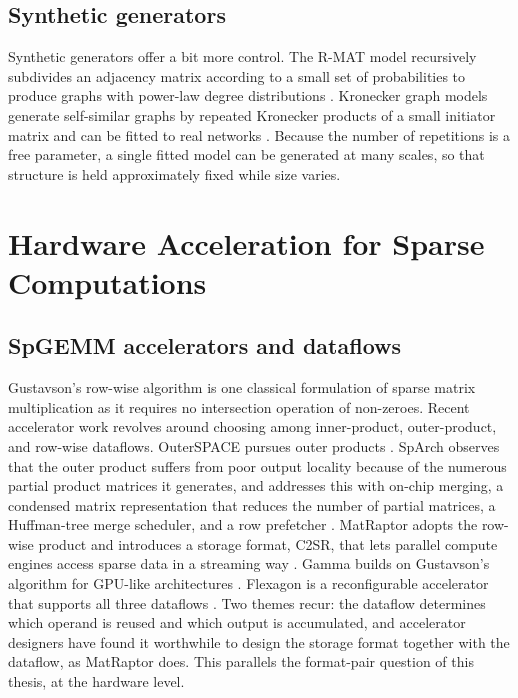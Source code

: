 \subsection{Synthetic generators}
Synthetic generators offer a bit more control. The R-MAT model recursively subdivides an adjacency matrix according to a small set of probabilities to produce graphs with power-law degree distributions \cite{chakrabarti2004rmat}. Kronecker graph models generate self-similar graphs by repeated Kronecker products of a small initiator matrix and can be fitted to real networks \cite{kronecker,moez}. Because the number of repetitions is a free parameter, a single fitted model can be generated at many scales, so that structure is held approximately fixed while size varies.

\section{Hardware Acceleration for Sparse Computations}
\label{sec:lit-accelerator}

\subsection{SpGEMM accelerators and dataflows}
Gustavson's row-wise algorithm is one classical formulation of sparse matrix multiplication \cite{gustavson1978} as it requires no intersection operation of non-zeroes. Recent accelerator work revolves around choosing among inner-product, outer-product, and row-wise dataflows. OuterSPACE pursues outer products \cite{pal2018outerspace}. SpArch observes that the outer product suffers from poor output locality because of the numerous partial product matrices it generates, and addresses this with on-chip merging, a condensed matrix representation that reduces the number of partial matrices, a Huffman-tree merge scheduler, and a row prefetcher \cite{zhang2020sparch}. MatRaptor adopts the row-wise product and introduces a storage format, C2SR, that lets parallel compute engines access sparse data in a streaming way \cite{srivastava2020matraptor}. Gamma builds on Gustavson's algorithm for GPU-like architectures \cite{zhang2021gamma}. Flexagon is a reconfigurable accelerator that supports all three dataflows \cite{munoz2023flexagon}. Two themes recur: the dataflow determines which operand is reused and which output is accumulated, and accelerator designers have found it worthwhile to design the storage format together with the dataflow, as MatRaptor does. This parallels the format-pair question of this thesis, at the hardware level.


